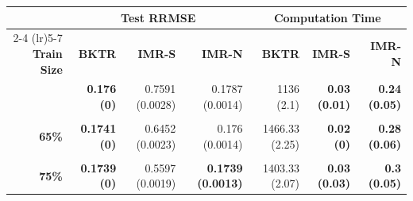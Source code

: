 \begin{table}[t]
\fontsize{12.0pt}{14.0pt}\selectfont
\begin{tabular*}{\linewidth}{@{\extracolsep{\fill}}rrrrrrr}
\toprule
 & \multicolumn{3}{c}{{\bfseries Test RRMSE}} & \multicolumn{3}{c}{{\bfseries Computation Time}} \\ 
\cmidrule(lr){2-4} \cmidrule(lr){5-7}
{\bfseries Train Size} & {\bfseries BKTR} & {\bfseries IMR-S} & {\bfseries IMR-N} & {\bfseries BKTR} & {\bfseries IMR-S} & {\bfseries IMR-N} \\ 
\midrule\addlinespace[2.5pt]
{\bfseries 55\%} & {\bfseries 0.176  (0)} & 0.7591  (0.0028) & 0.1787  (0.0014) & 1136 (2.1) & {\bfseries 0.03 (0.01)} & {\bfseries 0.24 (0.05)} \\ 
{\bfseries \cellcolor[HTML]{F0F0F0}{60\%}} & {\bfseries \cellcolor[HTML]{F0F0F0}{0.1745  (0)}} & {\cellcolor[HTML]{F0F0F0}{0.6978  (0.0024)}} & {\cellcolor[HTML]{F0F0F0}{0.1773  (0.0014)}} & {\cellcolor[HTML]{F0F0F0}{1403.17 (3.13)}} & {\bfseries \cellcolor[HTML]{F0F0F0}{0.03 (0.03)}} & {\bfseries \cellcolor[HTML]{F0F0F0}{0.25 (0.04)}} \\ 
{\bfseries 65\%} & {\bfseries 0.1741  (0)} & 0.6452  (0.0023) & 0.176  (0.0014) & 1466.33 (2.25) & {\bfseries 0.02 (0)} & {\bfseries 0.28 (0.06)} \\ 
{\bfseries \cellcolor[HTML]{F0F0F0}{70\%}} & {\bfseries \cellcolor[HTML]{F0F0F0}{0.1739  (0)}} & {\cellcolor[HTML]{F0F0F0}{0.5997  (0.0021)}} & {\cellcolor[HTML]{F0F0F0}{0.1748  (0.0013)}} & {\cellcolor[HTML]{F0F0F0}{1409 (3.58)}} & {\bfseries \cellcolor[HTML]{F0F0F0}{0.03 (0.03)}} & {\bfseries \cellcolor[HTML]{F0F0F0}{0.29 (0.07)}} \\ 
{\bfseries 75\%} & {\bfseries 0.1739  (0)} & 0.5597  (0.0019) & {\bfseries 0.1739  (0.0013)} & 1403.33 (2.07) & {\bfseries 0.03 (0.03)} & {\bfseries 0.3 (0.05)} \\ 
\bottomrule
\end{tabular*}
\end{table}

